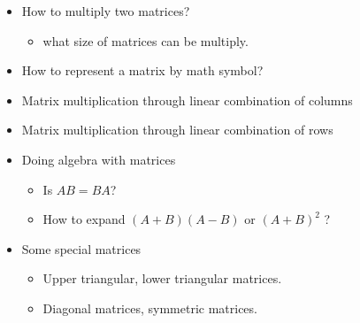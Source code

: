 

\subtitle{Linear Combination and Matrix Multiplication}\maketitle
{}

\begin{itemize}
\item How to multiply two matrices?
\begin{itemize}
	\item what size of matrices can be multiply.
\end{itemize}
\item How to represent a matrix by math symbol?
\item Matrix multiplication through linear combination of columns
\item Matrix multiplication through linear combination of rows 
\item Doing algebra with matrices
\begin{itemize}
\item Is $AB=BA$?
\item How to expand $(A+B)(A-B)$ or $(A+B)^2$ ?
\end{itemize}
\item Some special matrices
\begin{itemize}
\item Upper triangular, lower triangular matrices.
\item Diagonal matrices, symmetric matrices.
\end{itemize}
\end{itemize}




